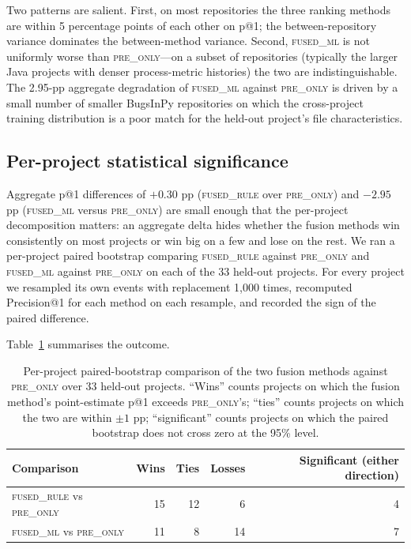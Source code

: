 \documentclass[preprint,12pt]{elsarticle}
\begin{document}
Two patterns are salient. First, on most repositories the three ranking methods are within 5 percentage points of each other on p@1; the between-repository variance dominates the between-method variance. Second, \textsc{fused\_ml} is not uniformly worse than \textsc{pre\_only}---on a subset of repositories (typically the larger Java projects with denser process-metric histories) the two are indistinguishable. The 2.95-pp aggregate degradation of \textsc{fused\_ml} against \textsc{pre\_only} is driven by a small number of smaller BugsInPy repositories on which the cross-project training distribution is a poor match for the held-out project's file characteristics.

\subsection{Per-project statistical significance}
\label{sec:results-perproject}

Aggregate p@1 differences of $+0.30$ pp (\textsc{fused\_rule} over \textsc{pre\_only}) and $-2.95$ pp (\textsc{fused\_ml} versus \textsc{pre\_only}) are small enough that the per-project decomposition matters: an aggregate delta hides whether the fusion methods win consistently on most projects or win big on a few and lose on the rest. We ran a per-project paired bootstrap comparing \textsc{fused\_rule} against \textsc{pre\_only} and \textsc{fused\_ml} against \textsc{pre\_only} on each of the 33 held-out projects. For every project we resampled its own events with replacement 1{,}000 times, recomputed Precision@1 for each method on each resample, and recorded the sign of the paired difference.

Table~\ref{tab:perproject-sig} summarises the outcome.

\begin{table}[!ht]
\centering
\caption{Per-project paired-bootstrap comparison of the two fusion methods against \textsc{pre\_only} over 33 held-out projects. ``Wins'' counts projects on which the fusion method's point-estimate p@1 exceeds \textsc{pre\_only}'s; ``ties'' counts projects on which the two are within $\pm 1$ pp; ``significant'' counts projects on which the paired bootstrap does not cross zero at the 95\% level.}
\label{tab:perproject-sig}
\small
\begin{tabular}{lrrrr}
\toprule
Comparison & Wins & Ties & Losses & Significant (either direction) \\
\midrule
\textsc{fused\_rule} vs \textsc{pre\_only} & 15 & 12 & 6  & 4 \\
\textsc{fused\_ml}   vs \textsc{pre\_only} & 11 & 8  & 14 & 7 \\
\bottomrule
\end{tabular}
\end{table}
\end{document}
